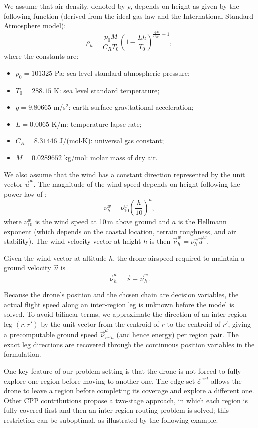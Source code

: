 \documentclass[12pt]{elsarticle}
\begin{document}
We assume that air density, denoted by $\rho$, depends on height as given by the following function (derived from the ideal gas law and the International Standard Atmosphere model):
$$
\rho_h=\frac{p_0 M}{C_RT_0}\left(1-\frac{Lh}{T_0}\right)^{\frac{gM}{C_RL}-1},
$$
where the constants are:
\begin{itemize}
    \item $p_0=101325$ Pa: sea level standard atmospheric pressure;
    \item $T_0=288.15$ K: sea level standard temperature;
    \item $g=9.80665$ m/s$^2$: earth-surface gravitational acceleration;
    \item $L=0.0065$ K/m: temperature lapse rate;
    \item $C_R=8.31446$ J/(mol$\cdot$K): universal gas constant;
    \item $M=0.0289652$ kg/mol: molar mass of dry air.
\end{itemize}

We also assume that the wind has a constant direction represented by the unit vector $\vec{u}^w$. The magnitude of the wind speed depends on height following the power law of \cite{heier2014grid}:
$$
\nu^w_h=\nu^w_{10}\left(\frac{h}{10}\right)^a,
$$
where $\nu^w_{10}$ is the wind speed at 10\,m above ground and $a$ is the Hellmann exponent (which depends on the coastal location, terrain roughness, and air stability). The wind velocity vector at height $h$ is then $\vec{\nu}_h^w=\nu^w_h \vec{u}^w$.

Given the wind vector at altitude $h$, the drone airspeed required to maintain a ground velocity $\vec{\nu}$ is
$$
\vec{\nu}_h^d = \vec{\nu} - \vec{\nu}_h^w.
$$

\noindent Because the drone's position and the chosen chain are decision variables, the actual flight speed along an inter-region leg is unknown before the model is solved. To avoid bilinear terms, we approximate the direction of an inter-region leg $(r,r')$ by the unit vector from the centroid of $r$ to the centroid of $r'$, giving a precomputable ground speed $\vec\nu_{rr'h}^d$ (and hence energy) per region pair. The exact leg directions are recovered through the continuous position variables in the formulation.

One key feature of our problem setting is that the drone is not forced to fully explore one region before moving to another one. The edge set $\mathcal E^{ext}$ allows the drone to leave a region before completing its coverage and explore a different one. Other CPP contributions propose a two-stage approach, in which each region is fully covered first and then an inter-region routing problem is solved; this restriction can be suboptimal, as illustrated by the following example.
\end{document}
